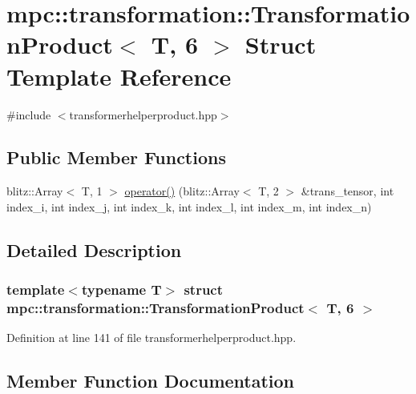 \hypertarget{structmpc_1_1transformation_1_1_transformation_product_3_01_t_00_016_01_4}{}\section{mpc\+:\+:transformation\+:\+:Transformation\+Product$<$ T, 6 $>$ Struct Template Reference}
\label{structmpc_1_1transformation_1_1_transformation_product_3_01_t_00_016_01_4}


{\ttfamily \#include $<$transformerhelperproduct.\+hpp$>$}

\subsection*{Public Member Functions}
\begin{DoxyCompactItemize}
\item 
blitz\+::\+Array$<$ T, 1 $>$ \mbox{\hyperlink{structmpc_1_1transformation_1_1_transformation_product_3_01_t_00_016_01_4_a2e9ebbdd2cb47148f9d2e9b08982228c}{operator()}} (blitz\+::\+Array$<$ T, 2 $>$ \&trans\+\_\+tensor, int index\+\_\+i, int index\+\_\+j, int index\+\_\+k, int index\+\_\+l, int index\+\_\+m, int index\+\_\+n)
\end{DoxyCompactItemize}


\subsection{Detailed Description}
\subsubsection*{template$<$typename T$>$\newline
struct mpc\+::transformation\+::\+Transformation\+Product$<$ T, 6 $>$}



Definition at line 141 of file transformerhelperproduct.\+hpp.



\subsection{Member Function Documentation}
\mbox{\label{structmpc_1_1transformation_1_1_transformation_product_3_01_t_00_016_01_4_a2e9ebbdd2cb47148f9d2e9b08982228c}} 
